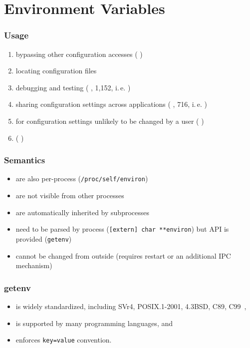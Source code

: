 \section{Environment Variables}

\begin{frame}
	\frametitle{Usage}
	\begin{enumerate}
	\item bypassing other configuration accesses (\methodQuestion{} )
	\item locating configuration files
	\item debugging and testing (\methodQuestion{} , \methodSource{} 1,152, i.\,e. )
	\item sharing configuration settings across applications (\methodQuestion{} , \methodSource{} 716, i.\,e. )
	\item for configuration settings unlikely to be changed by a user (\methodQuestion{} )
	\item {} (\methodQuestion{} )
	\end{enumerate}
\end{frame}

\begin{frame}
	\frametitle{Semantics}
	\begin{itemize}
	\item are also per-process (\texttt{/proc/self/environ})
	\item are not visible from other processes
	\item are automatically inherited by subprocesses
	\item need to be parsed by process (\texttt{[extern] char **environ}) but API is provided (\texttt{getenv})
	\item cannot be changed from outside (requires restart or an additional IPC mechanism)
	\end{itemize}
\end{frame}

\begin{frame}
	\frametitle{getenv}
	\begin{itemize}
	\item is widely standardized, including SVr4, POSIX.1-2001, 4.3BSD, C89, C99~\cite{man2017getenv},
	\item is supported by many programming languages, and
	\item enforces \texttt{key=value} convention.
	\end{itemize}
\end{frame}

